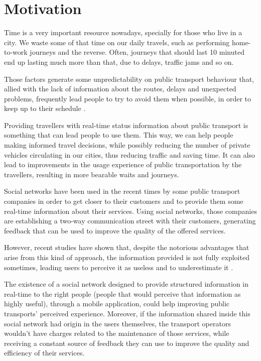 \section{Motivation} \label{sec:motivation}

Time is a very important resource nowadays, specially for those who live in a city. We waste some of that time on our daily travels, such as performing home-to-work journeys and the reverse. Often, journeys that should last 10 minuted end up lasting much more than that, due to delays, traffic jams and so on. 

Those factors generate some unpredictability on public transport behaviour that, allied with the lack of information about the routes, delays and unexpected problems, frequently lead people to try to avoid them when possible, in order to keep up to their schedule \cite{kn:BC07}.

Providing travellers with real-time status information about public transport is something that can lead people to use them. This way, we can help people making informed travel decisions, while possibly reducing the number of private vehicles circulating in our cities, thus reducing traffic and saving time. It can also lead to improvements in the usage experience of public transportation by the travellers, resulting in more bearable waits and journeys.

Social networks have been used in the recent times by some public transport companies in order to get closer to their customers and to provide them some real-time information about their services. Using social networks, those companies are establishing a two-way communication street with their customers, generating feedback that can be used to improve the quality of the offered services.

However, recent studies have shown that, despite the notorious advantages that arise from this kind of approach, the information provided is not fully exploited sometimes, leading users to perceive it as useless and to underestimate it \cite{kn:NGeCP11}.

The existence of a social network designed to provide structured information in real-time to the right people (people that would perceive that information as highly useful), through a mobile application, could help improving public transports' perceived experience. Moreover, if the information shared inside this social network had origin in the users themselves, the transport operators wouldn't have charges related to the maintenance of those services, while receiving a constant source of feedback they can use to improve the quality and efficiency of their services.

